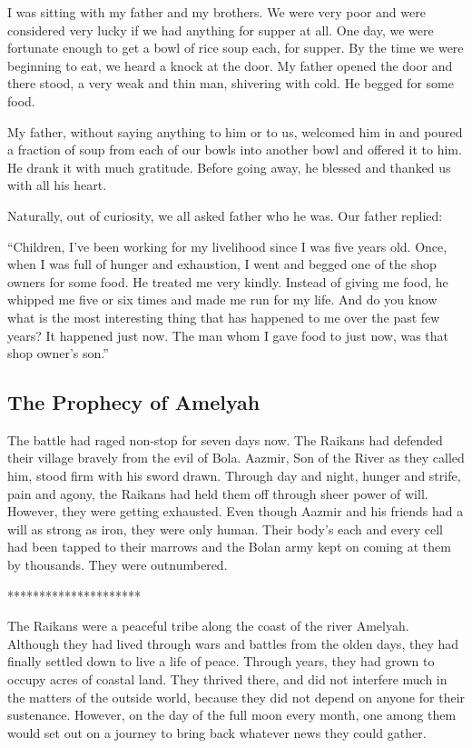 \documentclass[twoside,11pt,titlepage]{article}
\begin{document}
I was sitting with my father and my brothers. We were very poor and were considered very lucky if we had anything for supper at all. One day, we were fortunate enough to get a bowl of rice soup each, for supper. By the time we were beginning to eat, we heard a knock at the door. My father opened the door and there stood, a very weak and thin man, shivering with cold. He begged for some food.

My father, without saying anything to him or to us, welcomed him in and poured a fraction of soup from each of our bowls into another bowl and offered it to him. He drank it with much gratitude. Before going away, he blessed and thanked us with all his heart.

Naturally, out of curiosity, we all asked father who he was. Our father replied:

``Children, I've been working for my livelihood since I was five years old. Once, when I was full of hunger and exhaustion, I went and begged one of the shop owners for some food. He treated me very kindly. Instead of giving me food, he whipped me five or six times and made me run for my life. And do you know what is the most interesting thing that has happened to me over the past few years? It happened just now. The man whom I gave food to just now, was that shop owner's son.''

\newpage
\begin{center}
  \section{The Prophecy of Amelyah}
\end{center}
\bigskip
\bigskip
\bigskip
The battle had raged non-stop for seven days now. The Raikans had defended their village bravely from the evil of Bola. Aazmir, Son of the River as they called him, stood firm with his sword drawn. Through day and night, hunger and strife, pain and agony, the Raikans had held them off through sheer power of will. However, they were getting exhausted. Even though Aazmir and his friends had a will as strong as iron, they were only human. Their body's each and every cell had been tapped to their marrows and the Bolan army kept on coming at them by thousands. They were outnumbered.

\bigskip
\begin{center}
*********************
\end{center}

The Raikans were a peaceful tribe along the coast of the river Amelyah. Although they had lived through wars and battles from the olden days, they had finally settled down to live a life of peace. Through years, they had grown to occupy acres of coastal land. They thrived there, and did not interfere much in the matters of the outside world, because they did not depend on anyone for their sustenance. However, on the day of the full moon every month, one among them would set out on a journey to bring back whatever news they could gather.
\end{document}
